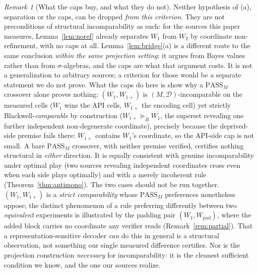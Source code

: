\documentclass[11pt]{article}
\theoremstyle{plain}
\theoremstyle{definition}
\theoremstyle{remark}
\newtheorem{remark}{Remark}
\newcommand{\PASS}{\mathrm{PASS}}
\newcommand{\Dcal}{\mathcal{D}}
\newcommand{\Bord}{\succeq_{B}}
\begin{document}
\begin{remark}[What the caps buy, and what they do not]
\label{rem:capsrole}
Neither hypothesis of \textup{(a)}, separation or the caps, can be dropped \emph{from this
criterion}. They are not preconditions of structural incomparability as such: for the sources
this paper measures, Lemma~\ref{lem:noref} already separates $W_1$ from $W_2$ by coordinate
non-refinement, with no caps at all. Lemma~\ref{lem:bridge}\textup{(a)} is a different route to
the same conclusion \emph{within the same projection setting}: it argues from Bayes values rather
than from $\sigma$-algebras, and the caps are what that argument costs. It is not a generalization
to arbitrary sources; a criterion for those would be a separate statement we do not prove. What the caps do here is show why a $\PASS_M$ crossover alone proves nothing:
$(W_1, W_{1+})$ is $(M,\Dcal)$-incomparable on the measured cells ($W_1$ wins the API cells,
$W_{1+}$ the encoding cell) yet strictly Blackwell-\emph{comparable} by construction
($W_{1+} \Bord W_1$, the superset revealing one further independent non-degenerate coordinate),
precisely because the deprived-side premise fails there: $W_{1+}$ contains $W_1$'s coordinate, so
the API-side cap is not small. A bare $\PASS_M$ crossover, with neither
premise verified, certifies nothing structural in \emph{either} direction. It is equally
consistent with genuine incomparability under optimal play (two sources revealing independent
coordinates cross even when each side plays optimally) and with a merely incoherent rule
(Theorem~\ref{thm:antimono}). The two cases should not be run together. $(W_1,W_{1+})$ is a
\emph{strict comparability} whose $\PASS_M$ preferences nonetheless oppose; the distinct
phenomenon of a rule preferring differently between two \emph{equivalent} experiments is
illustrated by the padding pair $(W_1,W_{\mathrm{pad}})$, where the added block carries no
coordinate any verifier reads (Remark~\ref{rem:partial}). That a representation-sensitive decoder
\emph{can} do this in general is a structural observation, not something our single measured
difference certifies. Nor is the projection construction \emph{necessary} for
incomparability: it is the cleanest sufficient condition we know, and the one our sources
realize.
\end{remark}
\end{document}
